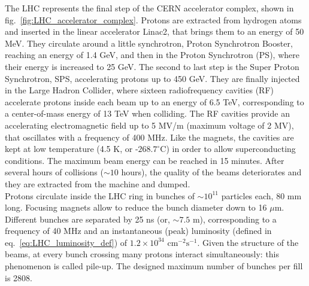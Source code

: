 \noindent The LHC represents the final step of the CERN accelerator complex, shown in fig.~\ref{fig:LHC_accelerator_complex}. Protons are extracted from hydrogen atoms and inserted in the linear accelerator Linac2, that brings them to an energy of 50 MeV. They circulate around a little synchrotron, Proton Synchrotron Booster, reaching an energy of 1.4 GeV, and then in the Proton Synchrotron (PS), where their energy is increased to 25 GeV. The second to last step is the Super Proton Synchrotron, SPS, accelerating protons up to 450 GeV. They are finally injected in the Large Hadron Collider, where sixteen radiofrequency cavities (RF) accelerate protons inside each beam up to an energy of 6.5 TeV, corresponding to a center-of-mass energy of 13 TeV when colliding. The RF cavities provide an accelerating electromagnetic field up to 5 MV/m (maximum voltage of 2 MV), that oscillates with a frequency of 400 MHz. Like the magnets, the cavities are kept at low temperature (4.5 K, or -$268.7^{\circ}$C) in order to allow superconducting conditions. The maximum beam energy can be reached in 15 minutes. After several hours of collisions ($\sim 10$ hours), the quality of the beams deteriorates and they are extracted from the machine and dumped.\\

\noindent Protons circulate inside the LHC ring in bunches of $\sim10^{11}$ particles each, 80 mm long. Focusing magnets allow to reduce the bunch diameter down to 16 $\mu$m. Different bunches are separated by 25 ns (or, $\sim 7.5$ m), corresponding to a frequency of 40 MHz and an instantaneous (peak) luminosity (defined in eq.~\ref{eq:LHC_luminosity_def}) of $1.2 \times 10^{34}\mbox{ cm}^{-2} \mbox{s}^{-1}$. Given the structure of the beams, at every bunch crossing many protons interact simultaneously: this phenomenon is called pile-up. The designed maximum number of bunches per fill is 2808.\\

